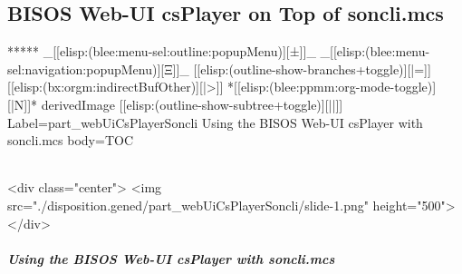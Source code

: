 \begin{whenOrg}
\newpage
\part{BISOS Web-UI csPlayer on Top of soncli.mcs}


\begin{whenOrg}
*****  _[[elisp:(blee:menu-sel:outline:popupMenu)][±]]_ _[[elisp:(blee:menu-sel:navigation:popupMenu)][Ξ]]_ [[elisp:(outline-show-branches+toggle)][|=]] [[elisp:(bx:orgm:indirectBufOther)][|>]] *[[elisp:(blee:ppmm:org-mode-toggle)][|N]]*  derivedImage [[elisp:(outline-show-subtree+toggle)][||]] Label=part_webUiCsPlayerSoncli Using the BISOS Web-UI csPlayer with soncli.mcs body=TOC
\end{whenOrg}

\begin{htmlonly}

\begin{frame}[fragile,plain,label=part_webUiCsPlayerSoncli]
    \frametitle{}
    \framesubtitle{}
    \begin{rawhtml}
<div class="center">
<img src="./disposition.gened/part_webUiCsPlayerSoncli/slide-1.png" height="500">
</div>
    \end{rawhtml}
\end{frame}
\end{htmlonly}

\begin{verblatex}

\begin{frame}[fragile,label=part_webUiCsPlayerSoncli]
    \frametitle{Using the BISOS Web-UI csPlayer with soncli.mcs}
    \framesubtitle{}

    \tableofcontents

\end{frame}
\end{verblatex}





\end{whenOrg}
